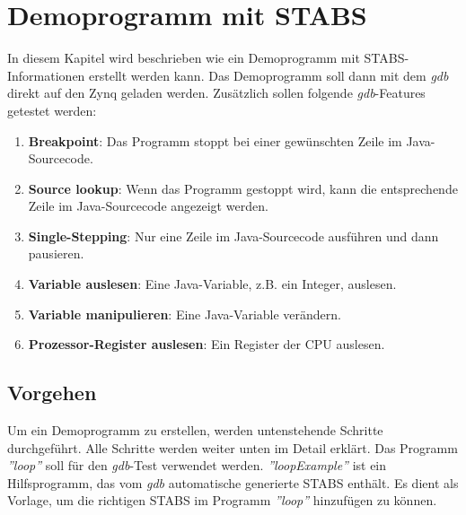 \section{Demoprogramm mit STABS}
\label{section:demoprogrammSTABS}
In diesem Kapitel wird beschrieben wie ein Demoprogramm mit STABS-Informationen erstellt werden kann.
Das Demoprogramm soll dann mit dem \textit{gdb} direkt auf den Zynq geladen werden.
Zusätzlich sollen folgende \textit{gdb}-Features getestet werden:\\
\begin{enumerate}
	\item \textbf{Breakpoint}: Das Programm stoppt bei einer gewünschten Zeile im Java-Sourcecode.
	\item \textbf{Source lookup}: Wenn das Programm gestoppt wird, kann die entsprechende Zeile im Java-Sourcecode angezeigt werden.
	\item \textbf{Single-Stepping}: Nur eine Zeile im Java-Sourcecode ausführen und dann pausieren.
	\item \textbf{Variable auslesen}: Eine Java-Variable, z.B. ein Integer, auslesen.
	\item \textbf{Variable manipulieren}: Eine Java-Variable verändern.
	\item \textbf{Prozessor-Register auslesen}: Ein Register der CPU auslesen.
\end{enumerate}

\subsection{Vorgehen}
Um ein Demoprogramm zu erstellen, werden untenstehende Schritte durchgeführt.
Alle Schritte werden weiter unten im Detail erklärt.
Das Programm \textit{''loop''} soll für den \textit{gdb}-Test verwendet werden.
\textit{''loopExample''} ist ein Hilfsprogramm, das vom \textit{gdb} automatische generierte STABS enthält.
Es dient als Vorlage, um die richtigen STABS im Programm \textit{''loop''} hinzufügen zu können.

